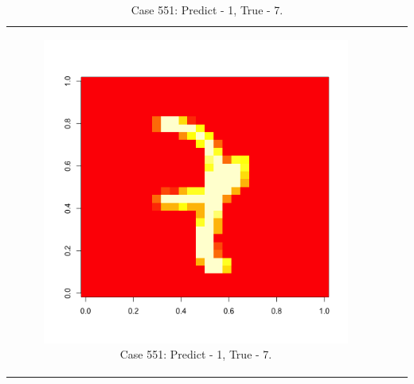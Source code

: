 \documentclass[10pt]{extarticle}
\begin{document}
\begin{table}[H]
\begin{tabular}{c c c}
\begin{subfigure}{0.3\textwidth}\centering\includegraphics[scale = .25]{../Images/551.png}\caption{Case 551: Predict - 1, True - 7.}\label{fig:taba}\end{subfigure}
\end{tabular}
\end{table}
\newpage
\end{document}
